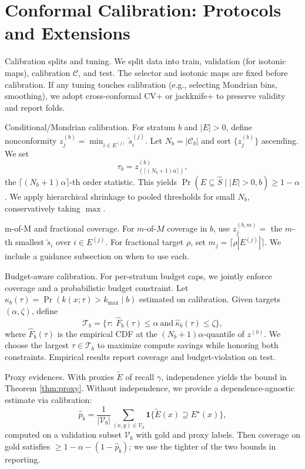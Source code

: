 \documentclass[11pt]{article}
\begin{document}
\section{Conformal Calibration: Protocols and Extensions}
Calibration splits and tuning. We split data into train, validation (for isotonic maps), calibration $\mathcal{C}$, and test. The selector and isotonic maps are fixed before calibration. If any tuning touches calibration (e.g., selecting Mondrian bins, smoothing), we adopt cross-conformal CV+ or jackknife+ to preserve validity and report folds.

Conditional/Mondrian calibration. For stratum $b$ and $|E|>0$, define nonconformity $z_j^{(b)}=\min_{i\in E^{(j)}} \tilde{s}_i^{(j)}$. Let $N_b=|\mathcal{C}_b|$ and sort $\{z_j^{(b)}\}$ ascending. We set
\[
\tau_b = z_{(\lceil (N_b+1)\alpha \rceil)}^{(b)},
\]
the $\lceil (N_b+1)\alpha\rceil$-th order statistic. This yields $\Pr(E\subseteq \hat{S}\mid |E|>0,b)\ge 1-\alpha$. We apply hierarchical shrinkage to pooled thresholds for small $N_b$, conservatively taking $\max$.

m-of-M and fractional coverage. For $m$-of-$M$ coverage in $b$, use $z_j^{(b,m)}=$ the $m$-th smallest $\tilde{s}_i$ over $i\in E^{(j)}$. For fractional target $\rho$, set $m_j=\lceil \rho |E^{(j)}|\rceil$. We include a guidance subsection on when to use each.

Budget-aware calibration. For per-stratum budget caps, we jointly enforce coverage and a probabilistic budget constraint. Let $\kappa_b(\tau)=\Pr(k(x;\tau)>k_{\max}\mid b)$ estimated on calibration. Given targets $(\alpha,\zeta)$, define
\[
\mathcal{T}_b = \{\tau: \ \hat{F}_b(\tau)\le \alpha \ \text{and} \ \hat{\kappa}_b(\tau)\le \zeta\},
\]
where $\hat{F}_b(\tau)$ is the empirical CDF at the $(N_b{+}1)\alpha$-quantile of $z^{(b)}$. We choose the largest $\tau\in \mathcal{T}_b$ to maximize compute savings while honoring both constraints. Empirical results report coverage and budget-violation on test.

Proxy evidences. With proxies $\tilde{E}$ of recall $\gamma$, independence yields the bound in Theorem \ref{thm:proxy}. Without independence, we provide a dependence-agnostic estimate via calibration:
\[
\hat{p}_b=\frac{1}{|\mathcal{V}_b|}\sum_{(x,y)\in \mathcal{V}_b}\mathbf{1}\{\tilde{E}(x)\supseteq E^\star(x)\},
\]
computed on a validation subset $\mathcal{V}_b$ with gold and proxy labels. Then coverage on gold satisfies $\ge 1-\alpha - (1-\hat{p}_b)$; we use the tighter of the two bounds in reporting.
\end{document}
